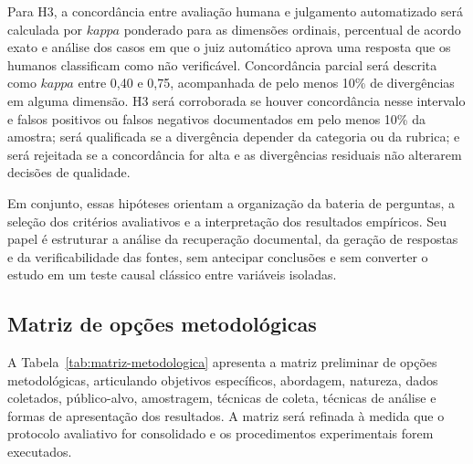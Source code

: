 Para H3, a concordância entre avaliação humana e julgamento automatizado será calculada por $kappa$ ponderado para as dimensões ordinais, percentual de acordo exato e análise dos casos em que o juiz automático aprova uma resposta que os humanos classificam como não verificável. Concordância parcial será descrita como $kappa$ entre 0,40 e 0,75, acompanhada de pelo menos 10\% de divergências em alguma dimensão. H3 será corroborada se houver concordância nesse intervalo e falsos positivos ou falsos negativos documentados em pelo menos 10\% da amostra; será qualificada se a divergência depender da categoria ou da rubrica; e será rejeitada se a concordância for alta e as divergências residuais não alterarem decisões de qualidade.

Em conjunto, essas hipóteses orientam a organização da bateria de perguntas, a seleção dos critérios avaliativos e a interpretação dos resultados empíricos. Seu papel é estruturar a análise da recuperação documental, da geração de respostas e da verificabilidade das fontes, sem antecipar conclusões e sem converter o estudo em um teste causal clássico entre variáveis isoladas.

\subsection{Matriz de opções metodológicas}

A Tabela~\ref{tab:matriz-metodologica} apresenta a matriz preliminar de opções metodológicas, articulando objetivos específicos,
abordagem, natureza, dados coletados, público-alvo, amostragem, técnicas de coleta, técnicas de análise e formas de apresentação
dos resultados. A matriz será refinada à medida que o protocolo avaliativo for consolidado e os procedimentos experimentais forem
executados.

